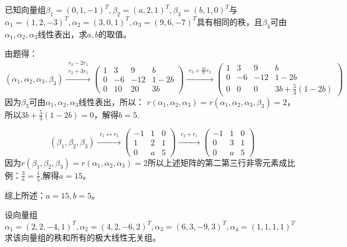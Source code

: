 \documentclass[a4paper]{report}
\begin{document}
\EX 已知向量组$\beta_1=(0,1,-1)^T,\beta_2=(a,2,1)^T,\beta_3=(b,1,0)^T$与
$\alpha_1= (1,2,-3)^T,\alpha_2=(3,0,1)^T,\alpha_3=(9,6,-7)^T$具有相同的秩，且$\beta_3$可由$\alpha_1,\alpha_2,\alpha_3$线性表出，求$a,b$的取值。

\begin{jie}
由题得：
\begin{equation*}
(\alpha_1,\alpha_2,\alpha_3,\beta_3)
\xrightarrow{\substack{r_2- 2r_{1}\\ r_3+3r_1}}
{\begin{pmatrix}
1&3&9&b\\
0&-6&-12&1-2b\\
0&10&20&3b\end{pmatrix}
}\xrightarrow{\substack{ r_3+\frac{10}{6}r_2}}
{\begin{pmatrix}
1&3&9&b\\
0&-6&-12&1-2b\\
0&0&0&3b+\frac{5}{3}(1-2b)\end{pmatrix}
}
\end{equation*}
因为$\beta_3$可由$\alpha_1,\alpha_2,\alpha_3$线性表出，所以：
$r(\alpha_1,\alpha_2,\alpha_3)=r(\alpha_1,\alpha_2,\alpha_3,\beta_3)=2$，所以$3b+\frac{5}{3}(1-2b)=0$，解得$b=5$.

\begin{equation*}
(\beta_1,\beta_2,\beta_3)
\xrightarrow{\substack{r_1\leftrightarrow r_3}}
{
\begin{pmatrix}
-1&1&0\\
1&2&1\\
0&a&5
\end{pmatrix}
}\xrightarrow{\substack{r_2+r_1}}
{
\begin{pmatrix}
-1&1&0\\
0&3&1\\
0&a&5
\end{pmatrix}
}
\end{equation*}
因为$r(\beta_1,\beta_2,\beta_3)=r(\alpha_1,\alpha_2,\alpha_3)=2$所以上述矩阵的第二第三行非零元素成比例：$
\frac{3}{a}=\frac{1}{5}
$,解得$a=15$。

综上所述：$a=15,b=5$。
\end{jie}

\EX 设向量组
$
\alpha_1=(2,2,-4,1)^T,\alpha_2=(4,2,-6,2)^T,\alpha_3=(6,3,-9,3)^T,\alpha_4=(1,1,1,1)^T
$求该向量组的秩和所有的极大线性无关组。
\end{document}
